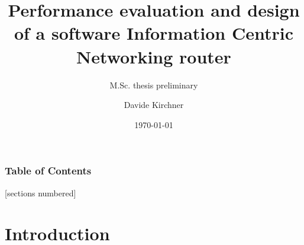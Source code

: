 
\usepackage{booktabs}
\usepackage[scale=2]{ccicons}

\usepackage{pgfplots}

\usepackage[vlined]{algorithm2e}
\newcommand{\mono}[1]{\texttt{#1}}
\usepackage{comment}
\usepackage{verbatim}
\usepackage{pgf}  %
\usepackage{tikz}


\newcommand{\extraslidesbegin}{
  \newcounter{framenumbervorappendix}
  \setcounter{framenumbervorappendix}{\value{framenumber}}
}
\newcommand{\extraslidesend}{
  \addtocounter{framenumbervorappendix}{-\value{framenumber}}
  \addtocounter{framenumber}{\value{framenumbervorappendix}} 
}

\title{Performance evaluation and design\\of a software Information Centric Networking router}
\subtitle{M.Sc. thesis preliminary}
\date{\today}
\author{Davide Kirchner}

%




\maketitle

\begin{frame}[fragile]
  \frametitle{Table of Contents}
  [sections numbered]
  \tableofcontents
\end{frame}

\section{Introduction}

